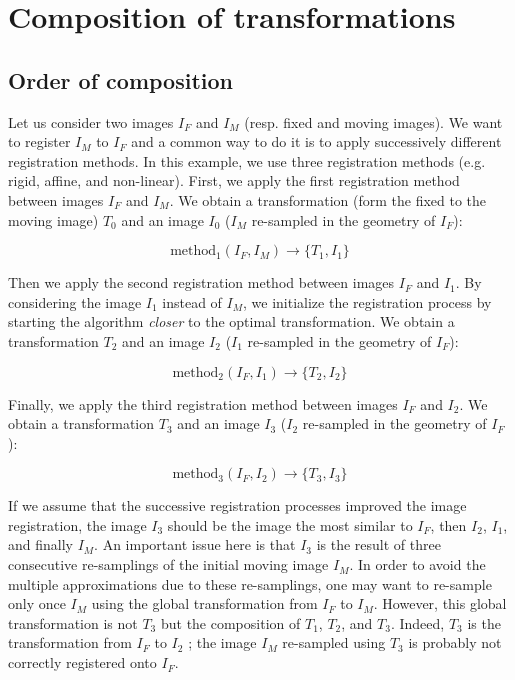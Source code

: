 \section{Composition of transformations}



\subsection{Order of composition}
\label{subsec:tools:composition:order}

Let us consider two images $I_F$ and $I_M$ (resp. fixed and moving images). We want to register $I_M$ to $I_F$ and a common way to do it is to apply successively different registration methods. In this example, we use three registration methods (e.g. rigid, affine, and non-linear). First, we apply the first registration method between images $I_F$ and $I_M$. We obtain a transformation (form the fixed to the moving image) $T_0$ and an image $I_0$ ($I_M$ re-sampled in the geometry of $I_F$):

\begin{equation}
\textrm{method}_1(I_F,I_M) \rightarrow \{T_1,I_1\}
\end{equation}

Then we apply the second registration method between images $I_F$ and $I_1$. By considering the image $I_1$ instead of $I_M$, we initialize the registration process by starting the algorithm \textit{closer} to the optimal transformation. We obtain a transformation $T_2$ and an image $I_2$ ($I_1$ re-sampled in the geometry of $I_F$):

\begin{equation}
\textrm{method}_2(I_F,I_1) \rightarrow \{T_2,I_2\}
\end{equation}

Finally, we apply the third registration method between images $I_F$ and $I_2$. We obtain a transformation $T_3$ and an image $I_3$ ($I_2$ re-sampled in the geometry of $I_F$):

\begin{equation}
\textrm{method}_3(I_F,I_2) \rightarrow \{T_3,I_3\}
\end{equation}

If we assume that the successive registration processes improved the image registration, the image $I_3$ should be the image the most similar to $I_F$, then $I_2$, $I_1$, and finally $I_M$. An important issue here is that $I_3$ is the result of three consecutive re-samplings of the initial moving image $I_M$. In order to avoid the multiple approximations due to these re-samplings, one may want to re-sample only once $I_M$ using the global transformation from $I_F$ to $I_M$. However, this global transformation is not $T_3$ but the composition of $T_1$, $T_2$, and $T_3$. Indeed, $T_3$ is the transformation from $I_F$ to $I_2$ ; the image $I_M$ re-sampled using $T_3$ is probably not correctly registered onto $I_F$.
\\

